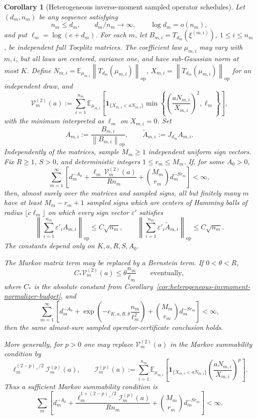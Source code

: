 \documentclass[11pt]{amsart}
\numberwithin{equation}{section}
\newtheorem{corollary}[theorem]{Corollary}
\theoremstyle{definition}
\theoremstyle{remark}
\newcommand{\op}{\mathrm{op}}
\newcommand{\Exp}{\mathbb E}
\newcommand{\norm}[1]{\left\lVert #1\right\rVert}
\newcommand{\eps}{\varepsilon}
\begin{document}
\begin{corollary}[Heterogeneous inverse-moment sampled operator schedules]
\label{cor:heterogeneous-invmoment-operator-schedules}
Let \((d_m,n_m)\) be any sequence satisfying
\[
  n_m\le d_m,\qquad d_m/n_m\to\infty,\qquad \log d_m=o(n_m),
\]
and put \(\ell_m=\log(e+d_m)\).  For each \(m\), let
\(B_{m,i}=T_{d_m}(\xi^{(m,i)})\), \(1\le i\le n_m\), be independent full
Toeplitz matrices.  The coefficient law \(\mu_{m,i}\) may vary with \(m,i\),
but all laws are centered, variance one, and have sub-Gaussian norm at most
\(K\).  Define \(N_{m,i}=\Exp_{\mu_{m,i}}\norm{T_{d_m}(\mu_{m,i})}_{\op}\),
\(X_{m,i}=\norm{T_{d_m}(\mu_{m,i})}_{\op}\) for an independent draw, and
\[
  \mathcal V_m^{(2)}(a):=
  \sum_{i=1}^{n_m}
  \Exp_{\mu_{m,i}}\left[
  \mathbf 1_{\{X_{m,i}<aN_{m,i}\}}
  \min\left\{
  \left(\frac{aN_{m,i}}{X_{m,i}}\right)^2,\ell_m
  \right\}\right],
\]
with the minimum interpreted as \(\ell_m\) on \(X_{m,i}=0\).  Set
\[
  A_{m,i}:=\frac{B_{m,i}}{\norm{B_{m,i}}_{\op}},
  \qquad
  \widetilde A_{m,i}:=J_{d_m}A_{m,i}.
\]
Independently of the matrices, sample \(M_m\ge1\) independent uniform sign
vectors.  Fix \(R\ge1\), \(S>0\), and deterministic integers
\(1\le r_m\le M_m\).  If, for some \(A_0>0\),
\[
  \sum_{m=1}^{\infty}
  \left[
    d_m^{-A_0}
    +\frac{\ell_m\,\mathcal V_m^{(2)}(a)}{R n_m}
    +\binom{M_m}{r_m}d_m^{-S r_m}
  \right]<\infty,
\]
then, almost surely over the matrices and sampled signs, all but finitely many
\(m\) have at least \(M_m-r_m+1\) sampled signs which are centers of Hamming
balls of radius \(\lfloor c\ell_m\rfloor\) on which every sign vector
\(\eps'\) satisfies
\[
  \left\|\sum_{i=1}^{n_m}\eps'_iA_{m,i}\right\|_{\op}
  \le C\sqrt{n_m},
  \qquad
  \left\|\sum_{i=1}^{n_m}\eps'_i\widetilde A_{m,i}\right\|_{\op}
  \le C\sqrt{n_m}.
\]
The constants depend only on \(K,a,R,S,A_0\).

The Markov matrix term may be replaced by a Bernstein term.  If \(0<\theta<R\),
\[
  C_*\mathcal V_m^{(2)}(a)\le \theta\frac{n_m}{\ell_m}
  \qquad\text{eventually},
\]
where \(C_*\) is the absolute constant from
Corollary~\ref{cor:heterogeneous-invmoment-normalizer-budget}, and
\[
  \sum_{m=1}^{\infty}
  \left[
    d_m^{-A_0}
    +\exp\left(-c_{K,a,R,\theta}\frac{n_m}{\ell_m^2}\right)
    +\binom{M_m}{r_m}d_m^{-S r_m}
  \right]<\infty,
\]
then the same almost-sure sampled operator-certificate conclusion holds.

More generally, for \(p>0\) one may replace
\(\mathcal V_m^{(2)}(a)\) in the Markov summability condition by
\[
  \ell_m^{(2-p)_+/2}\mathcal I_m^{(p)}(a),
  \qquad
  \mathcal I_m^{(p)}(a):=
  \sum_{i=1}^{n_m}
  \Exp_{\mu_{m,i}}\left[
  \mathbf 1_{\{X_{m,i}<aN_{m,i}\}}
  \left(\frac{aN_{m,i}}{X_{m,i}}\right)^p
  \right].
\]
Thus a sufficient Markov summability condition is
\[
  \sum_m\left[
    d_m^{-A_0}
    +\frac{\ell_m^{1+(2-p)_+/2}\mathcal I_m^{(p)}(a)}{R n_m}
    +\binom{M_m}{r_m}d_m^{-S r_m}
  \right]<\infty .
\]
\end{corollary}
\end{document}
